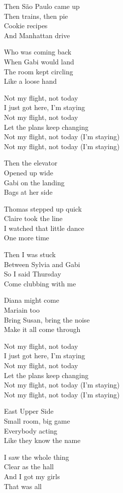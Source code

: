 \begin{lyrics}
Then São Paulo came up\\
Then trains, then pie\\
Cookie recipes\\
And Manhattan drive

Who was coming back\\
When Gabi would land\\
The room kept circling\\
Like a loose hand

Not my flight, not today\\
I just got here, I'm staying\\
Not my flight, not today\\
Let the plans keep changing\\
Not my flight, not today
(I'm staying)\\
Not my flight, not today
(I'm staying)

Then the elevator\\
Opened up wide\\
Gabi on the landing\\
Bags at her side

Thomas stepped up quick\\
Claire took the line\\
I watched that little dance\\
One more time

Then I was stuck\\
Between Sylvia and Gabi\\
So I said Thursday\\
Come clubbing with me

Diana might come\\
Mariain too\\
Bring Susan, bring the noise\\
Make it all come through

Not my flight, not today\\
I just got here, I'm staying\\
Not my flight, not today\\
Let the plans keep changing\\
Not my flight, not today
(I'm staying)\\
Not my flight, not today
(I'm staying)

East Upper Side\\
Small room, big game\\
Everybody acting\\
Like they know the name

I saw the whole thing\\
Clear as the hall\\
And I got my girls\\
That was all
\end{lyrics}

